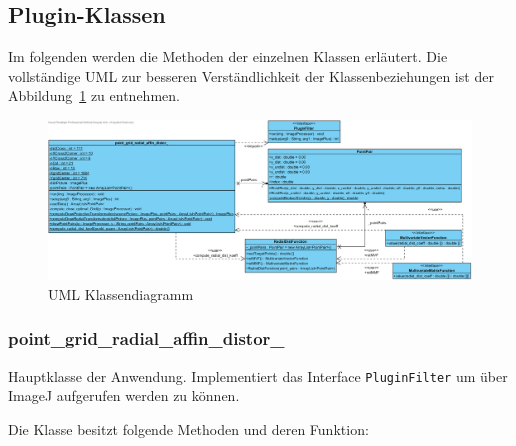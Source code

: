 \subsection{Plugin-Klassen}
\label{sec:PluginKlassen}

Im folgenden werden die Methoden der einzelnen Klassen erläutert. Die vollständige UML zur besseren Verständlichkeit der Klassenbeziehungen ist der Abbildung~\ref{img:UML} zu entnehmen.

\begin{figure}
	\center
	\includegraphics[width=\textheight, angle =90]{Images/Class Diagram1.png}
	\caption{UML Klassendiagramm}
	\label{img:UML}
\end{figure}

\subsubsection{point\_grid\_radial\_affin\_distor\_}
Hauptklasse der Anwendung. Implementiert das Interface \texttt{PluginFilter} um über ImageJ aufgerufen werden zu können.

Die Klasse besitzt folgende Methoden und deren Funktion:

